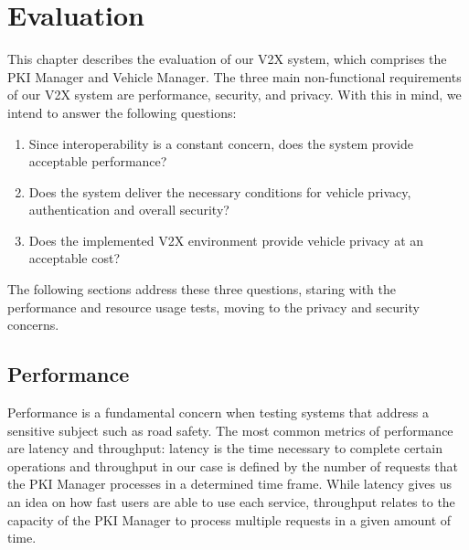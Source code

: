 \chapter{Evaluation}
\label{chapter:results}

This chapter describes the evaluation of our V2X system, which comprises the PKI Manager and Vehicle Manager. The three main non-functional requirements of our V2X system are performance, security, and privacy. With this in mind, we intend to answer the following questions: 

\begin{enumerate}
	\item Since interoperability is a constant concern, does the system provide acceptable performance? 
	\item Does the system deliver the necessary conditions for vehicle privacy, authentication and overall security?
	\item Does the implemented V2X environment provide vehicle privacy at an acceptable cost?
\end{enumerate}


The following sections address these three questions, staring with the performance and resource usage tests, moving to the privacy and security concerns. 

\section{Performance}
\label{section:performance}
Performance is a fundamental concern when testing systems that address a sensitive subject such as road safety. The most common metrics of performance are latency and throughput: latency is the time necessary to complete certain operations and throughput in our case is defined by the number of requests that the PKI Manager processes in a determined time frame. While latency gives us an idea on how fast users are able to use each service, throughput relates to the capacity of the PKI Manager to process multiple requests in a given amount of time.

